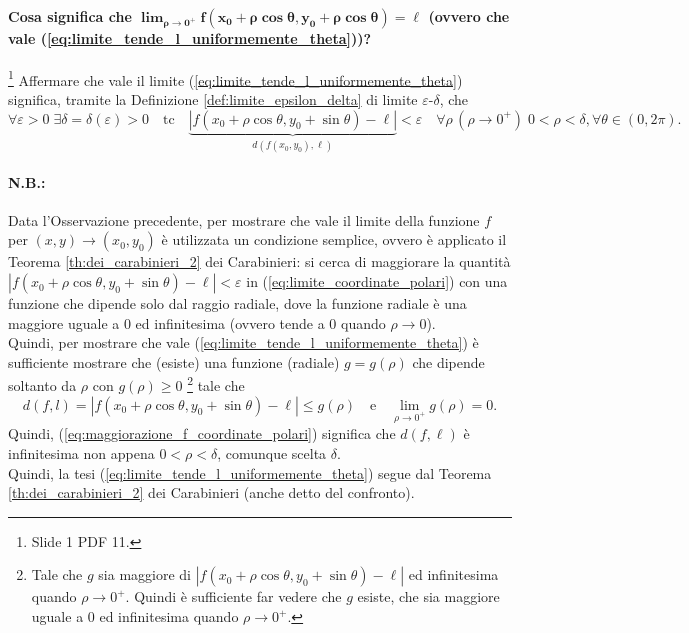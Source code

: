 \paragraph{Cosa significa che $\boldsymbol{\lim_{\rho\rightarrow0^+}f(x_0+\rho\cos\theta, y_0+\rho\cos\theta)=\ell}$ (ovvero che vale (\ref{eq:limite_tende_l_uniformemente_theta}))?}

\begin{remark}\footnote{Slide 1 PDF 11.}
    Affermare che vale il limite (\ref{eq:limite_tende_l_uniformemente_theta}) significa, tramite la Definizione \ref{def:limite_epsilon_delta} di limite $\varepsilon$-$\delta$, che
    \begin{equation}\label{eq:limite_coordinate_polari}
        \forall\varepsilon>0\; \exists\delta=\delta(\varepsilon)>0\quad\text{tc}\quad \underbrace{|f(x_0+\rho\cos\theta,y_0+\sin\theta)-\ell|}_{d(f(x_0, y_0),\ell)}<\varepsilon\quad\forall\rho\,(\rho\rightarrow0^+)\;0<\rho<\delta,\forall\theta\in(0,2\pi).
    \end{equation}
\end{remark}

\paragraph{N.B.:} Data l'Osservazione precedente, per mostrare che vale il limite della funzione $f$ per $(x,y)\rightarrow (x_0,y_0)$ è utilizzata un condizione semplice, ovvero è applicato il Teorema \ref{th:dei_carabinieri_2} dei Carabinieri: si cerca di maggiorare la quantità $|f(x_0+\rho\cos\theta,y_0+\sin\theta)-\ell|<\varepsilon$ in (\ref{eq:limite_coordinate_polari}) con una funzione che dipende solo dal raggio radiale, dove la funzione radiale è una maggiore uguale a 0 ed infinitesima (ovvero tende a 0 quando $\rho\rightarrow 0$).\\
Quindi, per mostrare che vale (\ref{eq:limite_tende_l_uniformemente_theta}) è sufficiente mostrare che (esiste) una funzione (radiale) $g=g(\rho)$ che dipende soltanto da $\rho$ con $g(\rho)\geq 0$ \footnote{Tale che $g$ sia maggiore di $|f(x_0+\rho\cos\theta,y_0+\sin\theta)-\ell|$ ed infinitesima quando $\rho\rightarrow 0^+$. Quindi è sufficiente far vedere che $g$ esiste, che sia maggiore uguale a 0 ed infinitesima quando $\rho\rightarrow 0^+$.} tale che
\begin{equation}\label{eq:maggiorazione_f_coordinate_polari}
    d(f,l)=|f(x_0+\rho\cos\theta,y_0+\sin\theta)-\ell|\leq g(\rho)\quad\text{e}\quad\lim_{\rho\rightarrow 0^+}g(\rho)=0.
\end{equation}
Quindi, (\ref{eq:maggiorazione_f_coordinate_polari}) significa che $d(f,\ell)$ è infinitesima non appena $0<\rho<\delta$, comunque scelta $\delta$.\\
Quindi, la tesi (\ref{eq:limite_tende_l_uniformemente_theta}) segue dal Teorema \ref{th:dei_carabinieri_2} dei Carabinieri (anche detto del confronto).

